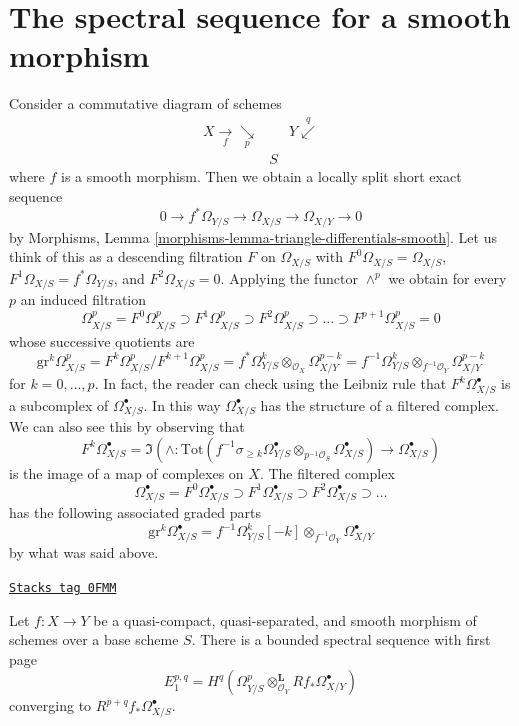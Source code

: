 \section{The spectral sequence for a smooth morphism}
\label{derham-section-relative-spectral-sequence}
Consider a commutative diagram of schemes
$$
\begin{array}{ccc}X \underset{f}{\longrightarrow}\underset{p}{\searrow} &  & Y \overset{q}{\swarrow} \\  & S & \end{array}
$$
where $f$ is a smooth morphism. Then we obtain a locally split short
exact sequence
$$
0 \to f^*\Omega_{Y/S} \to \Omega_{X/S} \to \Omega_{X/Y} \to 0
$$
by Morphisms, Lemma \ref{morphisms-lemma-triangle-differentials-smooth}.
Let us think of this as a descending filtration $F$ on $\Omega_{X/S}$
with $F^0\Omega_{X/S} = \Omega_{X/S}$, $F^1\Omega_{X/S} = f^*\Omega_{Y/S}$, and
$F^2\Omega_{X/S} = 0$. Applying the functor $\wedge^p$ we obtain
for every $p$ an induced filtration
$$
\Omega^p_{X/S} = F^0\Omega^p_{X/S} \supset
F^1\Omega^p_{X/S} \supset
F^2\Omega^p_{X/S} \supset \ldots \supset F^{p + 1}\Omega^p_{X/S} = 0
$$
whose successive quotients are
$$
\text{gr}^k\Omega^p_{X/S} =
F^k\Omega^p_{X/S}/F^{k + 1}\Omega^p_{X/S} =
f^*\Omega^k_{Y/S} \otimes_{\mathcal{O}_X} \Omega^{p - k}_{X/Y} =
f^{-1}\Omega^k_{Y/S} \otimes_{f^{-1}\mathcal{O}_Y} \Omega^{p - k}_{X/Y}
$$
for $k = 0, \ldots, p$. In fact, the reader can check using the
Leibniz rule that $F^k\Omega^\bullet_{X/S}$ is a subcomplex of
$\Omega^\bullet_{X/S}$. In this way $\Omega^\bullet_{X/S}$ has
the structure of a filtered complex. We can also see this by observing
that
$$
F^k\Omega^\bullet_{X/S} =
\Im\left(\wedge :
\text{Tot}(
f^{-1}\sigma_{\geq k}\Omega^\bullet_{Y/S} \otimes_{p^{-1}\mathcal{O}_S}
\Omega^\bullet_{X/S})
\longrightarrow
\Omega^\bullet_{X/S}\right)
$$
is the image of a map of complexes on $X$. The filtered complex
$$
\Omega^\bullet_{X/S} = F^0\Omega^\bullet_{X/S} \supset
F^1\Omega^\bullet_{X/S} \supset F^2\Omega^\bullet_{X/S} \supset \ldots
$$
has the following associated graded parts
$$
\text{gr}^k\Omega^\bullet_{X/S} =
f^{-1}\Omega^k_{Y/S}[-k] \otimes_{f^{-1}\mathcal{O}_Y} \Omega^\bullet_{X/Y}
$$
by what was said above.

\begin{lemma}
\label{derham-lemma-spectral-sequence-smooth}
\href{https://stacks.math.columbia.edu/tag/0FMM}{\texttt{Stacks tag 0FMM}}

Let $f : X \to Y$ be a quasi-compact, quasi-separated, and smooth
morphism of schemes over a base scheme $S$. There is a bounded spectral
sequence with first page
$$
E_1^{p, q} =
H^q(\Omega^p_{Y/S} \otimes_{\mathcal{O}_Y}^\mathbf{L} Rf_*\Omega^\bullet_{X/Y})
$$
converging to $R^{p + q}f_*\Omega^\bullet_{X/S}$.
\end{lemma}


